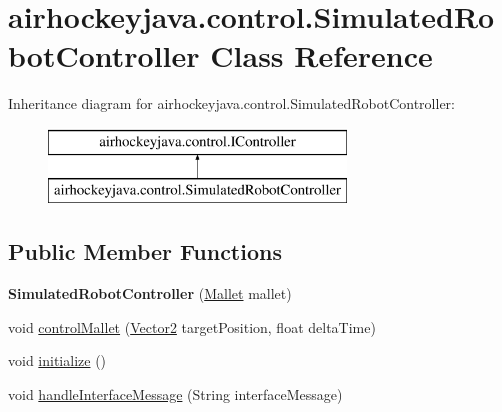 \hypertarget{classairhockeyjava_1_1control_1_1_simulated_robot_controller}{}\section{airhockeyjava.\+control.\+Simulated\+Robot\+Controller Class Reference}
\label{classairhockeyjava_1_1control_1_1_simulated_robot_controller}
Inheritance diagram for airhockeyjava.\+control.\+Simulated\+Robot\+Controller\+:\begin{figure}[H]
\begin{center}
\leavevmode
\includegraphics[height=2.000000cm]{classairhockeyjava_1_1control_1_1_simulated_robot_controller}
\end{center}
\end{figure}
\subsection*{Public Member Functions}
\begin{DoxyCompactItemize}
\item 
\hypertarget{classairhockeyjava_1_1control_1_1_simulated_robot_controller_aa233be404eede946d00654ac20fd0163}{}{\bfseries Simulated\+Robot\+Controller} (\hyperlink{classairhockeyjava_1_1physical_1_1_mallet}{Mallet} mallet)\label{classairhockeyjava_1_1control_1_1_simulated_robot_controller_aa233be404eede946d00654ac20fd0163}

\item 
void \hyperlink{classairhockeyjava_1_1control_1_1_simulated_robot_controller_a816642b3d25f3d5de4246c6067875321}{control\+Mallet} (\hyperlink{classairhockeyjava_1_1util_1_1_vector2}{Vector2} target\+Position, float delta\+Time)
\item 
void \hyperlink{classairhockeyjava_1_1control_1_1_simulated_robot_controller_a8b8c0344343abe472b6e3931924ebdd7}{initialize} ()
\item 
void \hyperlink{classairhockeyjava_1_1control_1_1_simulated_robot_controller_a21dbffaa724ca85b72a5aae1494501de}{handle\+Interface\+Message} (String interface\+Message)
\end{DoxyCompactItemize}


